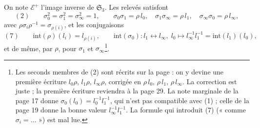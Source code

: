 \documentclass[11pt,a4paper]{article}
\begin{document}
On note $\mathcal{E}^{+}$ l'image inverse de $\mathfrak{S}_3$. Les relevés
satisfont
\[
(2)\qquad \sigma_0^2 = \sigma_1^2 = \sigma_\infty^2 = 1, \qquad
\sigma_0\sigma_1 = \rho\, l_0, \quad \sigma_1\sigma_\infty = \rho\, l_1, \quad
\sigma_\infty\sigma_0 = \rho\, l_\infty,
\]
avec $\rho\sigma_i\rho^{-1} = \sigma_{\rho(i)}$, et les conjugaisons
\[
(7)\qquad \mathrm{int}(\rho)(l_i) = l_{\rho(i)}, \qquad
\mathrm{int}(\sigma_0) : l_1 \leftrightarrow l_\infty,\;
l_0 \mapsto l_\infty^{-1} l_1^{-1} = \mathrm{int}(l_1)(l_0),
\]
et de même, par $\rho$, pour $\sigma_1$ et $\sigma_\infty$\footnote{Les seconds
membres de (2) sont récrits sur la page : on y devine une première écriture
$l_0\rho$, $l_1\rho$, $l_\infty\rho$, corrigée en $\rho\, l_0$, $\rho\, l_1$,
$\rho\, l_\infty$. La correction est juste ; la première écriture reviendra à
la page 29. La note marginale de la page 17 donne $\sigma_0(l_0) = l_0^{-1}
l_1^{-1}$, qui n'est pas compatible avec (1) ; celle de la page 19 donne la
bonne valeur $l_\infty^{-1} l_1^{-1}$. La formule qui introduit (7) (« comme
$\sigma_i = \ldots$ ») est mal lue.}.
\end{document}
